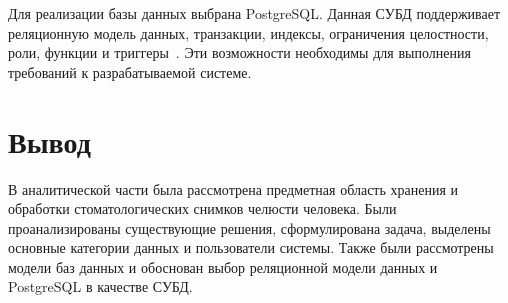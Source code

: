 Для реализации базы данных выбрана PostgreSQL. Данная СУБД поддерживает реляционную модель данных, транзакции, индексы, ограничения целостности, роли, функции и триггеры~\cite{postgresql-docs,postgresql-triggers,postgresql-privileges}. Эти возможности необходимы для выполнения требований к разрабатываемой системе.

\section*{Вывод}

В аналитической части была рассмотрена предметная область хранения и обработки стоматологических снимков челюсти человека. Были проанализированы существующие решения, сформулирована задача, выделены основные категории данных и пользователи системы. Также были рассмотрены модели баз данных и обоснован выбор реляционной модели данных и PostgreSQL в качестве СУБД.

\clearpage